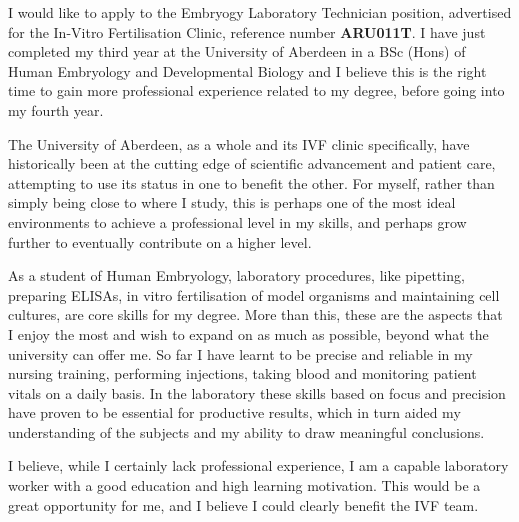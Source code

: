 \documentclass[paper=a4,fontsize=11pt]{scrartcl} %
\newcommand{\sepspace}{\vspace*{1em}}		%
\begin{document}

  \cleardoublepage

  \sepspace
  
    \noindent
    I would like to apply to the Embryogy Laboratory Technician position, advertised for the In-Vitro Fertilisation Clinic, reference number \textbf{ARU011T}. I have just completed my third year at the University of Aberdeen in a BSc (Hons) of Human Embryology and Developmental Biology and I believe this is the right time to gain more professional experience related to my degree, before going into my fourth year.
    \sepspace
    
    
    \noindent
    The University of Aberdeen, as a whole and its IVF clinic specifically, have historically been at the cutting edge of scientific advancement and patient care, attempting to use its status in one to benefit the other. For myself, rather than simply being close to where I study, this is perhaps one of the most ideal environments to achieve a professional level in my skills, and perhaps grow further to eventually contribute on a higher level.
    \sepspace
    
    
    \noindent
    As a student of Human Embryology, laboratory procedures, like pipetting, preparing ELISAs, in vitro fertilisation of model organisms and maintaining cell cultures, are core skills for my degree. More than this, these are the aspects that I enjoy the most and wish to expand on as much as possible, beyond what the university can offer me. So far I have learnt to be precise and reliable in my nursing training, performing injections, taking blood and monitoring patient vitals on a daily basis. In the laboratory these skills based on focus and precision have proven to be essential for productive results, which in turn aided my understanding of the subjects and my ability to draw meaningful conclusions.
    \sepspace
    
    
    \noindent
    I believe, while I certainly lack professional experience, I am a capable laboratory worker with a good education and high learning motivation. This would be a great opportunity for me, and I believe I could clearly benefit the IVF team.

  
  
\end{document}
